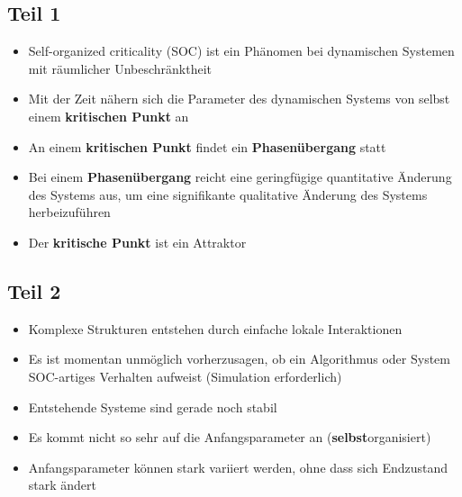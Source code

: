 \documentclass{beamer}
\begin{document}
\subsection{Teil 1}
\begin{frame}{\insertsection}{\insertsubsection}
	\begin{itemize}
		\item Self-organized criticality (SOC) ist ein Phänomen bei dynamischen Systemen mit
            räumlicher Unbeschränktheit
        \pause
        \item Mit der Zeit nähern sich die Parameter des dynamischen Systems von selbst einem
            \textbf{kritischen Punkt} an
        \pause
        \item An einem \textbf{kritischen Punkt} findet ein \textbf{Phasenübergang} statt
        \pause
        \item Bei einem \textbf{Phasenübergang} reicht eine geringfügige quantitative Änderung des Systems
            aus, um eine signifikante qualitative Änderung des Systems herbeizuführen
        \pause
        \item Der \textbf{kritische Punkt} ist ein Attraktor
	\end{itemize}
\end{frame}

\subsection{Teil 2}
\begin{frame}{\insertsection}{\insertsubsection}
	\begin{itemize}
		\item Komplexe Strukturen entstehen durch einfache lokale Interaktionen
        \pause
		\item Es ist momentan unmöglich vorherzusagen, ob ein Algorithmus oder System
            SOC-artiges Verhalten aufweist (Simulation erforderlich)
        \pause
        \item Entstehende Systeme sind gerade noch stabil
        \pause
        \item Es kommt nicht so sehr auf die Anfangsparameter an (\textbf{selbst}organisiert)
        \item Anfangsparameter können stark variiert werden, ohne dass sich Endzustand stark ändert
	\end{itemize}
\end{frame}
\end{document}
